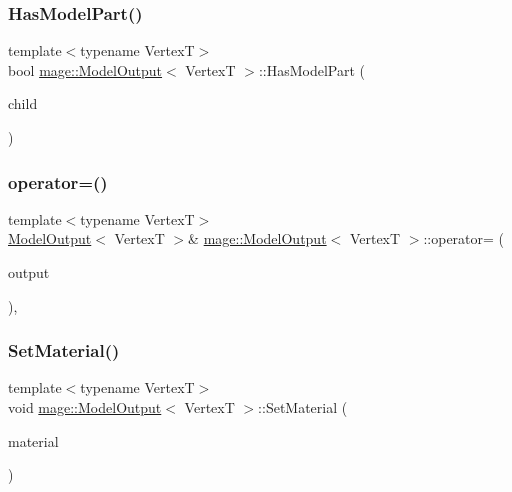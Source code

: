 \subsubsection{\texorpdfstring{Has\+Model\+Part()}{HasModelPart()}}
{\footnotesize\ttfamily template$<$typename VertexT$>$ \\
bool \hyperlink{structmage_1_1_model_output}{mage\+::\+Model\+Output}$<$ VertexT $>$\+::Has\+Model\+Part (\begin{DoxyParamCaption}\item[{const string \&}]{child }\end{DoxyParamCaption})}

\hypertarget{structmage_1_1_model_output_a22a473a6e34c6bcc81e645e692a1a1fc}{}\label{structmage_1_1_model_output_a22a473a6e34c6bcc81e645e692a1a1fc} 
\subsubsection{\texorpdfstring{operator=()}{operator=()}}
{\footnotesize\ttfamily template$<$typename VertexT$>$ \\
\hyperlink{structmage_1_1_model_output}{Model\+Output}$<$ VertexT $>$\& \hyperlink{structmage_1_1_model_output}{mage\+::\+Model\+Output}$<$ VertexT $>$\+::operator= (\begin{DoxyParamCaption}\item[{\hyperlink{structmage_1_1_model_output}{Model\+Output}$<$ VertexT $>$ \&}]{output }\end{DoxyParamCaption})\hspace{0.3cm}{\ttfamily [private]}, {\ttfamily [delete]}}

\hypertarget{structmage_1_1_model_output_abd614f9f2e9f9dbc0b2c354ee37f2998}{}\label{structmage_1_1_model_output_abd614f9f2e9f9dbc0b2c354ee37f2998} 
\subsubsection{\texorpdfstring{Set\+Material()}{SetMaterial()}}
{\footnotesize\ttfamily template$<$typename VertexT$>$ \\
void \hyperlink{structmage_1_1_model_output}{mage\+::\+Model\+Output}$<$ VertexT $>$\+::Set\+Material (\begin{DoxyParamCaption}\item[{const string \&}]{material }\end{DoxyParamCaption})}

